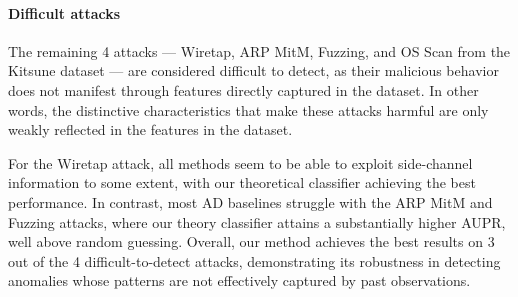 \documentclass{article}
\begin{document}
\paragraph*{Difficult attacks}
The remaining 4 attacks --- Wiretap, ARP MitM, Fuzzing, and OS Scan from the Kitsune dataset --- are considered difficult to detect, as their malicious behavior does not manifest through features directly captured in the dataset. In other words, the distinctive characteristics that make these attacks harmful are only weakly reflected in the features in the dataset.

For the Wiretap attack, all methods seem to be able to exploit side-channel information to some extent, with our theoretical classifier achieving the best performance. In contrast, most AD baselines struggle with the ARP MitM and Fuzzing attacks, where our theory classifier attains a substantially higher AUPR, well above random guessing. Overall, our method achieves the best results on 3 out of the 4 difficult-to-detect attacks, demonstrating its robustness in detecting anomalies whose patterns are not effectively captured by past observations.










\end{document}
